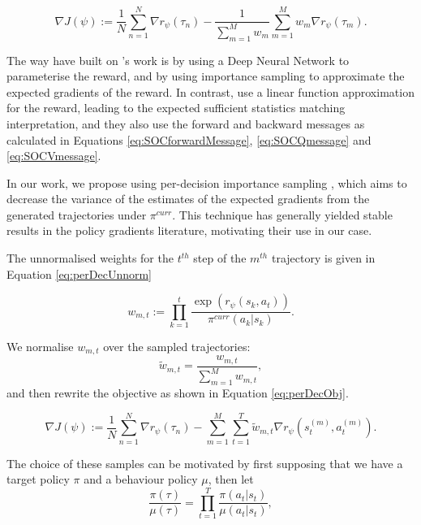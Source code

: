 \documentclass{report}
\numberwithin{equation}{section}
\numberwithin{figure}{section}
\numberwithin{table}{section}
\numberwithin{algorithm}{section}
\begin{document}
\begin{equation}\label{eq:irlEpisodicImpSampledObj}
  \nabla J(\psi):=\frac{1}{N} \sum_{n=1}^N \nabla r_\psi(\tau_n)
  - \frac{1}{\sum_{m=1}^M w_m}\sum_{m=1}^M w_m\nabla r_\psi(\tau_m).
\end{equation}

The way \cite{FinnGCL} have built on \cite{Ziebart2008}'s work is 
by using a Deep Neural Network to parameterise the reward, and 
by using importance sampling to approximate the expected 
gradients of the reward. In contrast, \cite{Ziebart2008} use 
a linear function approximation for the reward, leading to the 
expected sufficient statistics matching interpretation, and 
they also use the forward and backward messages as calculated 
in Equations \ref{eq:SOCforwardMessage}, \ref{eq:SOCQmessage} 
and \ref{eq:SOCVmessage}.

In our work, we propose using 
per-decision importance sampling \citep{perDecision}, which 
aims to decrease the variance of the estimates of the expected 
gradients from the generated trajectories under $\pi^{curr}$. 
This technique has generally yielded stable results in the 
policy gradients literature, motivating their use in our case.

The unnormalised weights for the $t^{th}$ step of the $m^{th}$ 
trajectory is given in Equation \ref{eq:perDecUnnorm}

\begin{equation}\label{eq:perDecUnnorm}
  w_{m,t}:=\prod_{k=1}^t \frac{\exp(r_\psi(s_k,a_t))}{\pi^{curr}(a_k|s_k)}.
\end{equation}

We normalise $w_{m,t}$ over the sampled trajectories:
\begin{equation*}
  \tilde{w}_{m,t}=\frac{w_{m,t}}{\sum_{m=1}^M w_{m,t}},
\end{equation*}
and then rewrite the objective as shown in Equation \ref{eq:perDecObj}.

\begin{equation}\label{eq:perDecObj}
  \nabla J(\psi):=\frac{1}{N} \sum_{n=1}^N \nabla r_\psi(\tau_n)
  - \sum_{m=1}^M \sum_{t=1}^T\tilde{w}_{m,t}\nabla r_\psi(s_t^{(m)},a_t^{(m)}).
\end{equation}

The choice of these samples can be motivated by first supposing 
that we have a target policy $\pi$ and a behaviour policy 
$\mu$, then let 
\begin{equation*}
  \frac{\pi(\tau)}{\mu(\tau)}=\prod_{t=1}^T{\frac{\pi(a_t|s_t)}{\mu(a_t|s_t)}},
\end{equation*}
\end{document}
